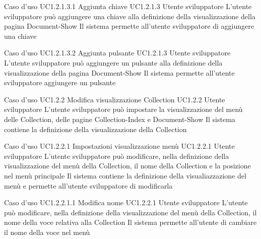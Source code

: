 \UCtitle
{Caso d'uso UC1.2.1.3.1}
{Aggiunta chiave}
\UC
{UC1.2.1.3}
{Utente sviluppatore}
{L'utente sviluppatore  può aggiungere una chiave alla definizione della visualizzazione della pagina Document-Show}
{Il sistema permette all'utente sviluppatore di aggiungere una chiave}

\UCtitle
{Caso d'uso UC1.2.1.3.2}
{Aggiunta pulsante}
\UC
{UC1.2.1.3}
{Utente sviluppatore}
{L'utente sviluppatore  può aggiungere un pulsante alla definizione della visualizzazione della pagina Document-Show}
{Il sistema permette all'utente sviluppatore aggiungere un pulsante}


\UCtitle
{Caso d'uso UC1.2.2}
{Modifica visualizzazione Collection}
\UC
{UC1.2.2}
{Utente sviluppatore}
{L'utente sviluppatore  può impostare la visualizzazione del menù delle Collection, delle pagine Collection-Index e Document-Show}
{Il sistema contiene la definizione della visualizzazione della Collection}

\UCtitle
{Caso d'uso UC1.2.2.1}
{Impostazioni visualizzazione menù}
\UC
{UC1.2.2.1}
{Utente sviluppatore}
{L'utente sviluppatore può modificare, nella definizione della visualizzazione del menù della Collection, il nome della Collection e la posizione nel menù principale}
{Il sistema contiene la definizione della visualiazzazione del menù e permette all'utente sviluppatore di modificarla}


\UCtitle
{Caso d'uso UC1.2.2.1.1}
{Modifica nome}
\UC
{UC1.2.2.1}
{Utente sviluppatore}
{L'utente può modificare, nella definizione della visualizzazione del menù della Collection, il nome della voce relativa alla Collection}
{Il sistema permette all'utente di cambiare il nome della voce nel menù}

